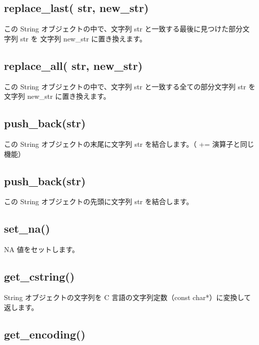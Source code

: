 \documentclass[]{book}
\begin{document}
\hypertarget{replace_last-str-new_str}{%
\subsection{replace\_last( str, new\_str)}\label{replace_last-str-new_str}}

この String オブジェクトの中で、文字列 str と一致する最後に見つけた部分文字列 str を 文字列 new\_str に置き換えます。

\hypertarget{replace_all-str-new_str}{%
\subsection{replace\_all( str, new\_str)}\label{replace_all-str-new_str}}

この String オブジェクトの中で、文字列 str と一致する全ての部分文字列 str を 文字列 new\_str に置き換えます。

\hypertarget{push_backstr}{%
\subsection{push\_back(str)}\label{push_backstr}}

この String オブジェクトの末尾に文字列 str を結合します。（ += 演算子と同じ機能）

\hypertarget{push_backstr-1}{%
\subsection{push\_back(str)}\label{push_backstr-1}}

この String オブジェクトの先頭に文字列 str を結合します。

\hypertarget{set_na}{%
\subsection{set\_na()}\label{set_na}}

NA 値をセットします。

\hypertarget{get_cstring}{%
\subsection{get\_cstring()}\label{get_cstring}}

String オブジェクトの文字列を C 言語の文字列定数（const char*）に変換して返します。

\hypertarget{get_encoding}{%
\subsection{get\_encoding()}\label{get_encoding}}
\end{document}
